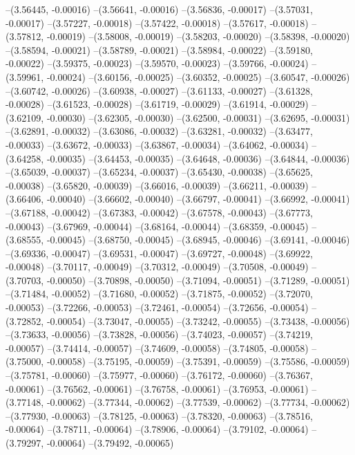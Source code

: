 --(3.56445, -0.00016)
--(3.56641, -0.00016)
--(3.56836, -0.00017)
--(3.57031, -0.00017)
--(3.57227, -0.00018)
--(3.57422, -0.00018)
--(3.57617, -0.00018)
--(3.57812, -0.00019)
--(3.58008, -0.00019)
--(3.58203, -0.00020)
--(3.58398, -0.00020)
--(3.58594, -0.00021)
--(3.58789, -0.00021)
--(3.58984, -0.00022)
--(3.59180, -0.00022)
--(3.59375, -0.00023)
--(3.59570, -0.00023)
--(3.59766, -0.00024)
--(3.59961, -0.00024)
--(3.60156, -0.00025)
--(3.60352, -0.00025)
--(3.60547, -0.00026)
--(3.60742, -0.00026)
--(3.60938, -0.00027)
--(3.61133, -0.00027)
--(3.61328, -0.00028)
--(3.61523, -0.00028)
--(3.61719, -0.00029)
--(3.61914, -0.00029)
--(3.62109, -0.00030)
--(3.62305, -0.00030)
--(3.62500, -0.00031)
--(3.62695, -0.00031)
--(3.62891, -0.00032)
--(3.63086, -0.00032)
--(3.63281, -0.00032)
--(3.63477, -0.00033)
--(3.63672, -0.00033)
--(3.63867, -0.00034)
--(3.64062, -0.00034)
--(3.64258, -0.00035)
--(3.64453, -0.00035)
--(3.64648, -0.00036)
--(3.64844, -0.00036)
--(3.65039, -0.00037)
--(3.65234, -0.00037)
--(3.65430, -0.00038)
--(3.65625, -0.00038)
--(3.65820, -0.00039)
--(3.66016, -0.00039)
--(3.66211, -0.00039)
--(3.66406, -0.00040)
--(3.66602, -0.00040)
--(3.66797, -0.00041)
--(3.66992, -0.00041)
--(3.67188, -0.00042)
--(3.67383, -0.00042)
--(3.67578, -0.00043)
--(3.67773, -0.00043)
--(3.67969, -0.00044)
--(3.68164, -0.00044)
--(3.68359, -0.00045)
--(3.68555, -0.00045)
--(3.68750, -0.00045)
--(3.68945, -0.00046)
--(3.69141, -0.00046)
--(3.69336, -0.00047)
--(3.69531, -0.00047)
--(3.69727, -0.00048)
--(3.69922, -0.00048)
--(3.70117, -0.00049)
--(3.70312, -0.00049)
--(3.70508, -0.00049)
--(3.70703, -0.00050)
--(3.70898, -0.00050)
--(3.71094, -0.00051)
--(3.71289, -0.00051)
--(3.71484, -0.00052)
--(3.71680, -0.00052)
--(3.71875, -0.00052)
--(3.72070, -0.00053)
--(3.72266, -0.00053)
--(3.72461, -0.00054)
--(3.72656, -0.00054)
--(3.72852, -0.00054)
--(3.73047, -0.00055)
--(3.73242, -0.00055)
--(3.73438, -0.00056)
--(3.73633, -0.00056)
--(3.73828, -0.00056)
--(3.74023, -0.00057)
--(3.74219, -0.00057)
--(3.74414, -0.00057)
--(3.74609, -0.00058)
--(3.74805, -0.00058)
--(3.75000, -0.00058)
--(3.75195, -0.00059)
--(3.75391, -0.00059)
--(3.75586, -0.00059)
--(3.75781, -0.00060)
--(3.75977, -0.00060)
--(3.76172, -0.00060)
--(3.76367, -0.00061)
--(3.76562, -0.00061)
--(3.76758, -0.00061)
--(3.76953, -0.00061)
--(3.77148, -0.00062)
--(3.77344, -0.00062)
--(3.77539, -0.00062)
--(3.77734, -0.00062)
--(3.77930, -0.00063)
--(3.78125, -0.00063)
--(3.78320, -0.00063)
--(3.78516, -0.00064)
--(3.78711, -0.00064)
--(3.78906, -0.00064)
--(3.79102, -0.00064)
--(3.79297, -0.00064)
--(3.79492, -0.00065)
